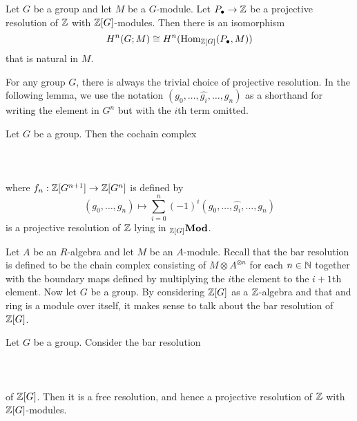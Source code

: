 \documentclass[a4paper]{article}
\begin{document}
\begin{prp}{}{} Let $G$ be a group and let $M$ be a $G$-module. Let $P_\bullet\to\mathbb{Z}$ be a projective resolution of $\mathbb{Z}$ with $\mathbb{Z}[G]$-modules. Then there is an isomorphism $$H^n(G;M)\cong H^n(\operatorname{Hom}_{\mathbb{Z}[G]}(P_\bullet,M))$$ that is natural in $M$. 
\end{prp}

For any group $G$, there is always the trivial choice of projective resolution. 
In the following lemma, we use the notation $(g_0,\dots,\hat{g_i},\dots,g_n)$ as a shorthand for writing the element in $G^n$ but with the $i$th term omitted. 

\begin{lmm}{}{} Let $G$ be a group. Then the cochain complex \\~\\
\\~\\ where $f_n:\mathbb{Z}[G^{n+1}]\to\mathbb{Z}[G^n]$ is defined by $$(g_0,\dots,g_n)\mapsto\sum_{i=0}^n(-1)^i(g_0,\dots,\hat{g_i},\dots,g_n)$$ is a projective resolution of $\mathbb{Z}$ lying in ${_{\mathbb{Z}[G]}}\bold{Mod}$. 
\end{lmm}

Let $A$ be an $R$-algebra and let $M$ be an $A$-module. Recall that the bar resolution is defined to be the chain complex consisting of $M\otimes A^{\otimes n}$ for each $n\in\mathbb{N}$ together with the boundary maps defined by multiplying the $i$the element to the $i+1$th element. Now let $G$ be a group. By considering $\mathbb{Z}[G]$ as a $\mathbb{Z}$-algebra and that and ring is a module over itself, it makes sense to talk about the bar resolution of $\mathbb{Z}[G]$. 

\begin{thm}{}{} Let $G$ be a group. Consider the bar resolution \\~\\
\\~\\
of $\mathbb{Z}[G]$. Then it is a free resolution, and hence a projective resolution of $\mathbb{Z}$ with $\mathbb{Z}[G]$-modules. 
\end{thm}
\end{document}
